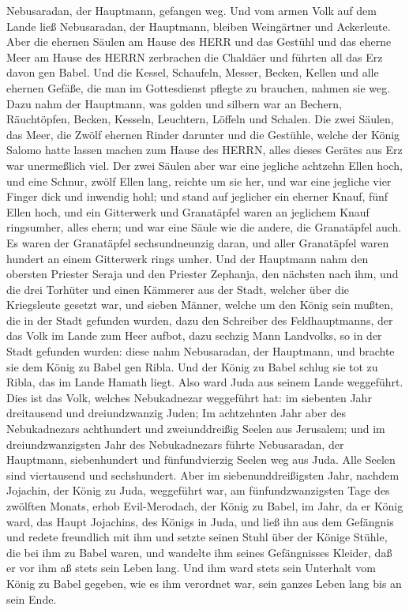 Nebusaradan, der Hauptmann, gefangen weg.  Und vom armen
Volk auf dem Lande ließ Nebusaradan, der Hauptmann, bleiben Weingärtner
und Ackerleute.  Aber die ehernen Säulen am Hause des HERR
und das Gestühl und das eherne Meer am Hause des HERRN zerbrachen die
Chaldäer und führten all das Erz davon gen Babel.  Und die
Kessel, Schaufeln, Messer, Becken, Kellen und alle ehernen Gefäße, die
man im Gottesdienst pflegte zu brauchen, nahmen sie weg. 
Dazu nahm der Hauptmann, was golden und silbern war an Bechern,
Räuchtöpfen, Becken, Kesseln, Leuchtern, Löffeln und Schalen.
 Die zwei Säulen, das Meer, die Zwölf ehernen Rinder
darunter und die Gestühle, welche der König Salomo hatte lassen machen
zum Hause des HERRN, alles dieses Gerätes aus Erz war unermeßlich viel.
 Der zwei Säulen aber war eine jegliche achtzehn Ellen
hoch, und eine Schnur, zwölf Ellen lang, reichte um sie her, und war
eine jegliche vier Finger dick und inwendig hohl;  und
stand auf jeglicher ein eherner Knauf, fünf Ellen hoch, und ein
Gitterwerk und Granatäpfel waren an jeglichem Knauf ringsumher, alles
ehern; und war eine Säule wie die andere, die Granatäpfel auch.
 Es waren der Granatäpfel sechsundneunzig daran, und aller
Granatäpfel waren hundert an einem Gitterwerk rings umher. 
Und der Hauptmann nahm den obersten Priester Seraja und den Priester
Zephanja, den nächsten nach ihm, und die drei Torhüter  und
einen Kämmerer aus der Stadt, welcher über die Kriegsleute gesetzt war,
und sieben Männer, welche um den König sein mußten, die in der Stadt
gefunden wurden, dazu den Schreiber des Feldhauptmanns, der das Volk im
Lande zum Heer aufbot, dazu sechzig Mann Landvolks, so in der Stadt
gefunden wurden:  diese nahm Nebusaradan, der Hauptmann,
und brachte sie dem König zu Babel gen Ribla.  Und der
König zu Babel schlug sie tot zu Ribla, das im Lande Hamath liegt. Also
ward Juda aus seinem Lande weggeführt.  Dies ist das Volk,
welches Nebukadnezar weggeführt hat: im siebenten Jahr dreitausend und
dreiundzwanzig Juden;  Im achtzehnten Jahr aber des
Nebukadnezars achthundert und zweiunddreißig Seelen aus Jerusalem;
 und im dreiundzwanzigsten Jahr des Nebukadnezars führte
Nebusaradan, der Hauptmann, siebenhundert und fünfundvierzig Seelen weg
aus Juda. Alle Seelen sind viertausend und sechshundert. 
Aber im siebenunddreißigsten Jahr, nachdem Jojachin, der König zu Juda,
weggeführt war, am fünfundzwanzigsten Tage des zwölften Monats, erhob
Evil-Merodach, der König zu Babel, im Jahr, da er König ward, das Haupt
Jojachins, des Königs in Juda, und ließ ihn aus dem Gefängnis
 und redete freundlich mit ihm und setzte seinen Stuhl über
der Könige Stühle, die bei ihm zu Babel waren,  und
wandelte ihm seines Gefängnisses Kleider, daß er vor ihm aß stets sein
Leben lang.  Und ihm ward stets sein Unterhalt vom König zu
Babel gegeben, wie es ihm verordnet war, sein ganzes Leben lang bis an
sein Ende.
